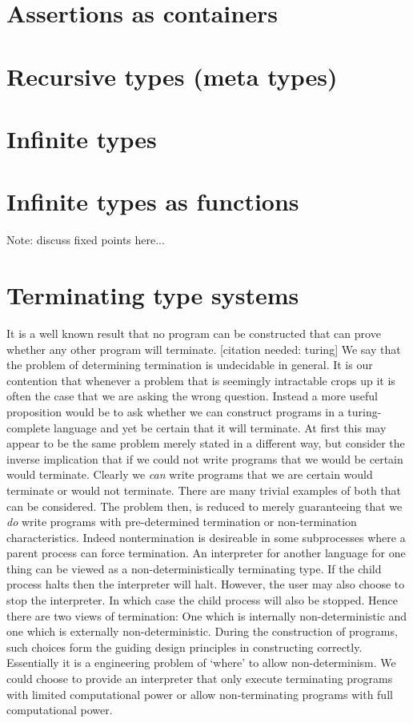 \documentclass[11pt]{article}
\begin{document}
\section*{Assertions as containers}

\section*{Recursive types (meta types)}

\section*{Infinite types}

\section*{Infinite types as functions}
Note: discuss fixed points here...

\section*{Terminating type systems}
It is a well known result that no program can be constructed that can prove whether any other program will terminate. [citation needed: turing]
We say that the problem of determining termination is undecidable in general.
It is our contention that whenever a problem that is seemingly intractable crops up it is often the case that we are asking the wrong question.
Instead a more useful proposition would be to ask whether we can construct programs in a turing-complete language and yet be certain that it will terminate.
At first this may appear to be the same problem merely stated in a different way, but consider the inverse implication that if we could not write programs that we would be certain would terminate.
Clearly we \emph{can} write programs that we are certain would terminate or would not terminate. 
There are many trivial examples of both that can be considered.
The problem then, is reduced to merely guaranteeing that we \emph{do} write programs with pre-determined termination or non-termination characteristics.
Indeed nontermination is desireable in some subprocesses where a parent process can force termination. 
An interpreter for another language for one thing can be viewed as a non-deterministically terminating type. 
If the child process halts then the interpreter will halt. 
However, the user may also choose to stop the interpreter. In which case the child process will also be stopped.
Hence there are two views of termination: One which is internally non-deterministic and one which is externally non-deterministic.
During the construction of programs, such choices form the guiding design principles in constructing correctly.
Essentially it is a engineering problem of `where' to allow non-determinism. We could choose to provide an interpreter that only execute terminating programs with limited computational power or allow non-terminating 
programs with full computational power.
\end{document}
